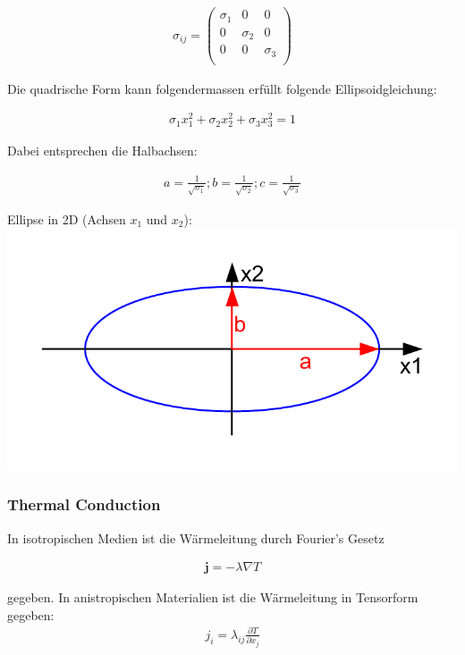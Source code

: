 \documentclass[a4paper]{scrartcl}
\begin{document}
\begin{align}
\sigma_{ij}=\begin{pmatrix}
\sigma_1 & 0 & 0 \\
0 & \sigma_2 & 0 \\
0 & 0 & \sigma_3 \\
\end{pmatrix}
\end{align}

Die quadrische Form kann folgendermassen erfüllt folgende Ellipsoidgleichung:

\begin{align}
\sigma_1x_1^2+\sigma_2x_2^2+\sigma_3x_3^2=1
\end{align}


Dabei entsprechen die Halbachsen:

\begin{align}
a=\frac{1}{\sqrt{\sigma_1}}; b=\frac{1}{\sqrt{\sigma_2}};
c=\frac{1}{\sqrt{\sigma_3}}
\end{align}

\begin{center}
Ellipse in 2D (Achsen $x_1$ und $x_2$):\\
\includegraphics[scale=0.8]{images/quadrik_2d_ellipse.pdf}
\end{center}

\subsubsection{Thermal Conduction}
In isotropischen Medien ist die Wärmeleitung durch Fourier's Gesetz

\begin{align}
\mathbf{j}=-\lambda \nabla T
\end{align}

gegeben. In anistropischen Materialien ist die Wärmeleitung in Tensorform
gegeben:
\begin{align}
j_i=\lambda_{ij}\frac{\partial T}{\partial x_j}
\end{align}
\end{document}
